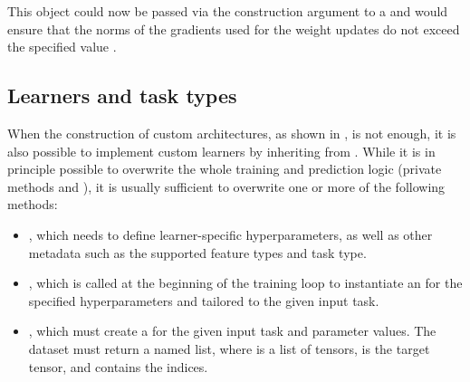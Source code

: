 \documentclass[article]{jss}
\theoremstyle{definition}
\begin{document}

This object could now be passed via the  construction argument to a  and would ensure that the norms of the gradients used for the weight updates do not exceed the specified value .

\subsection{Learners and task types}\label{sec:extending-learner-task}

When the construction of custom architectures, as shown in , is not enough, it is also possible to implement custom learners by inheriting from .
While it is in principle possible to overwrite the whole training and prediction logic (private methods  and ), it is usually sufficient to overwrite one or more of the following methods:

\begin{itemize}
    \item {}, which needs to define learner-specific hyperparameters, as well as other metadata such as the supported feature types and task type.
    \item {}, which is called at the beginning of the training loop to instantiate an  for the specified hyperparameters and tailored to the given input task.
    \item {}, which must create a  for the given input task and parameter values. The dataset must return a named list, where  is a list of tensors,  is the target tensor, and  contains the indices.
\end{itemize}
\end{document}
